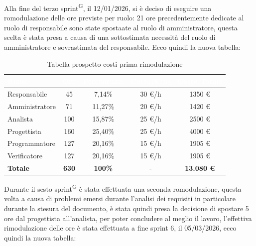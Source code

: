 \documentclass[a4paper, 11pt]{article}
\begin{document}
Alla fine del terzo sprint\textsuperscript{G}, il 12/01/2026, si è deciso di eseguire una romodulazione delle ore previste per ruolo: 21 ore precedentemente dedicate al ruolo di responsabile sono state spostaate al ruolo di amministratore, questa scelta è stata presa a causa di una sottostimata necessità del ruolo di amministratore e sovrastimata del responsabile.
Ecco quindi la nuova tabella:
\begin{table}[H]
  \centering
  \begin{tabular}{|l|c|c|c|c|}
    \hline
    \cellcolor{AccentColor}\textbf{\textcolor{white}{Ruolo}} & 
    \cellcolor{AccentColor}\textbf{\textcolor{white}{Ore}} & 
    \cellcolor{AccentColor}\textbf{\textcolor{white}{Percentuale}} & 
    \cellcolor{AccentColor}\textbf{\textcolor{white}{Costo(€/h)}} & 
    \cellcolor{AccentColor}\textbf{\textcolor{white}{Costo Totale}} \\
    \hline
    
    Responsabile & 45 & 7,14\% & 30 €/h & 1350 € \\ \hline
    Amministratore & 71 & 11,27\% & 20 €/h & 1420 € \\ \hline
    Analista & 100 & 15,87\% & 25 €/h & 2500 € \\ \hline
    Progettista & 160 & 25,40\% & 25 €/h & 4000 € \\ \hline
    Programmatore & 127 & 20,16\% & 15 €/h & 1905 € \\ \hline
    Verificatore & 127 & 20,16\% & 15 €/h & 1905 € \\ \hline
    \textbf{Totale} & \textbf{630} & \textbf{100\%} & - & \textbf{13.080 €} \\ \hline
  \end{tabular}
  \caption{Tabella prospetto costi prima rimodulazione}
\end{table}

Durante il sesto sprint\textsuperscript{G} è stata effettuata una seconda romodulazione, questa volta a causa di problemi emersi durante l'analisi dei requisiti in particolare durante la stesura del documento, è stata quindi presa la decisione di spostare 5 ore dal progettista all'analista, per poter concludere al meglio il lavoro, l'effettiva rimodulazione delle ore è stata effettuata a fine sprint 6, il 05/03/2026, ecco quindi la nuova tabella:
\end{document}
